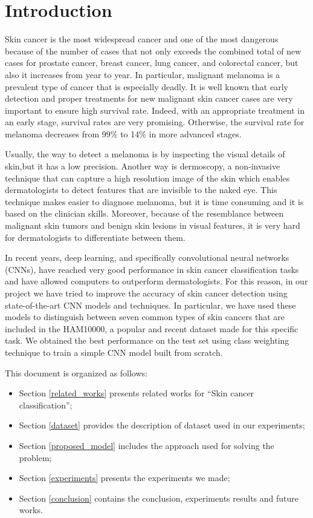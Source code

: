 \section{Introduction}

	Skin cancer is the most widespread cancer and one of the most dangerous because of the number of cases that not only exceeds the combined total of new cases for prostate cancer, breast cancer, lung cancer, and colorectal cancer, but also it increases from year to year. In particular, malignant melanoma is a prevalent type of cancer that is especially deadly. It is well known that early detection and proper treatments for new malignant skin cancer cases are very important to ensure high survival rate. Indeed, with an appropriate treatment in an early stage, survival rates are very promising. Otherwise, the survival rate for melanoma decreases from 99\% to 14\% in more advanced stages.
	
	\smallskip
	
	Usually, the way to detect a melanoma is by inspecting the visual details of skin,but it has a low precision. Another way is dermoscopy, a non-invasive technique that can capture a high resolution image of the skin which enables dermatologists to detect features that are invisible to the naked eye. This technique makes easier to diagnose melanoma, but it is time consuming and it is based on the clinician skills. Moreover, because of the resemblance between malignant skin tumors and benign skin lesions in visual features, it is very hard for dermatologists to differentiate between them.
	
	\smallskip
	
	In recent years, deep learning, and specifically convolutional neural networks (CNNs), have reached very good performance in skin cancer classification tasks and have allowed computers to outperform dermatologists. For this reason, in our project we have tried to improve the accuracy of skin cancer detection using state-of-the-art CNN models and techniques. In particular, we have used these models to distinguish between seven common types of skin cancers that are included in the HAM10000, a popular and recent dataset made for this specific task. We obtained the best performance on the test set using class weighting technique to train a simple CNN model built from scratch. 
	
	\bigskip
	
	This document is organized as follows:  
	\begin{itemize}
		\item Section \ref{related_works} presents related works for ``Skin cancer classification'';
		\item Section \ref{dataset} provides the description of dataset used in our experiments;
		\item Section \ref{proposed_model} includes the approach used for solving the problem;
		\item Section \ref{experiments} presents the experiments we made;
		\item Section \ref{conclusion} contains the conclusion, experiments results and future works.
	\end{itemize}